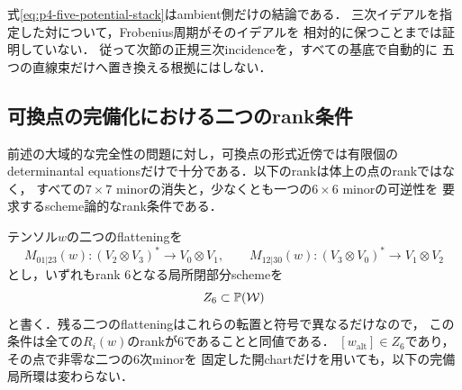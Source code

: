 式\eqref{eq:p4-five-potential-stack}はambient側だけの結論である．
三次イデアルを指定した対について，Frobenius周期がそのイデアルを
相対的に保つことまでは証明していない．
従って次節の正規三次incidenceを，すべての基底で自動的に
五つの直線束だけへ置き換える根拠にはしない．

\subsection{可換点の完備化における二つのrank条件}
\label{subsec:p3-formal-rank}

前述の大域的な完全性の問題に対し，可換点の形式近傍では有限個の
determinantal equationsだけで十分である．以下のrankは体上の点のrankではなく，
すべての$7\times7$ minorの消失と，少なくとも一つの$6\times6$ minorの可逆性を
要求するscheme論的なrank条件である．

テンソル$w$の二つのflatteningを
\[
 M_{01|23}(w):(V_2\otimes V_3)^*\longrightarrow V_0\otimes V_1,
 \qquad
 M_{12|30}(w):(V_3\otimes V_0)^*\longrightarrow V_1\otimes V_2
\]
とし，いずれもrank $6$となる局所閉部分schemeを
\[
 Z_6\subset\mathbb P(\mathcal W)
\]
と書く．残る二つのflatteningはこれらの転置と符号で異なるだけなので，
この条件は全ての$R_i(w)$のrankが$6$であることと同値である．
$[w_{\mathrm{alt}}]\in Z_6$であり，その点で非零な二つの$6$次minorを
固定した開chartだけを用いても，以下の完備局所環は変わらない．

